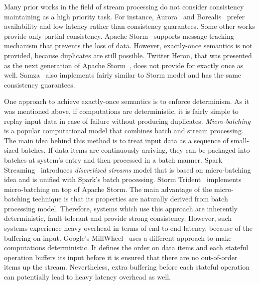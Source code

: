 
\label {fs-related-seciton}

Many prior works in the field of stream processing do not consider consistency maintaining as a high priority task. For instance, Aurora~\cite{Abadi:2003:ANM:950481.950485} and Borealis~\cite{abadi2005design} prefer availability and low latency rather than consistency guarantees. Some other works provide only partial consistency. Apache Storm~\cite{apache:storm} supports message tracking mechanism that prevents the loss of data. However, exactly-once semantics is not provided, because duplicates are still possible. Twitter Heron, that was presented as the next generation of Apache Storm~\cite{Kulkarni:2015:THS:2723372.2742788}, does not provide for exactly once as well. Samza~\cite{Noghabi:2017:SSS:3137765.3137770} also implements fairly similar to Storm model and has the same consistency guarantees.  

One approach to achieve exactly-once semantics is to enforce determinism. As it was mentioned above, if computations are deterministic, it is fairly simple to replay input data in case of failure without producing duplicates. {\it Micro-batching} is a popular computational model that combines batch and stream processing. The main idea behind this method is to treat input data as a sequence of small-sized batches. If data items are continuously arriving, they can be packaged into batches at system's entry and then processed in a batch manner. Spark Streaming~\cite{Zaharia:2012:DSE:2342763.2342773} introduces {\it discretized streams} model that is based on micro-batching idea and is unified with Spark's batch processing. Storm Trident~\cite{apache:storm:trident} implements micro-batching on top of Apache Storm. The main advantage of the micro-batching technique is that its properties are naturally derived from batch processing model. Therefore, systems which use this approach are inherently deterministic, fault tolerant and provide strong consistency. However, such systems experience heavy overhead in terms of end-to-end latency, because of the buffering on input. Google's MillWheel~\cite{Akidau:2013:MFS:2536222.2536229} uses a different approach to make computations deterministic. It defines the order on data items and each stateful operation buffers its input before it is ensured that there are no out-of-order items up the stream. Nevertheless, extra buffering before each stateful operation can potentially lead to heavy latency overhead as well.   

